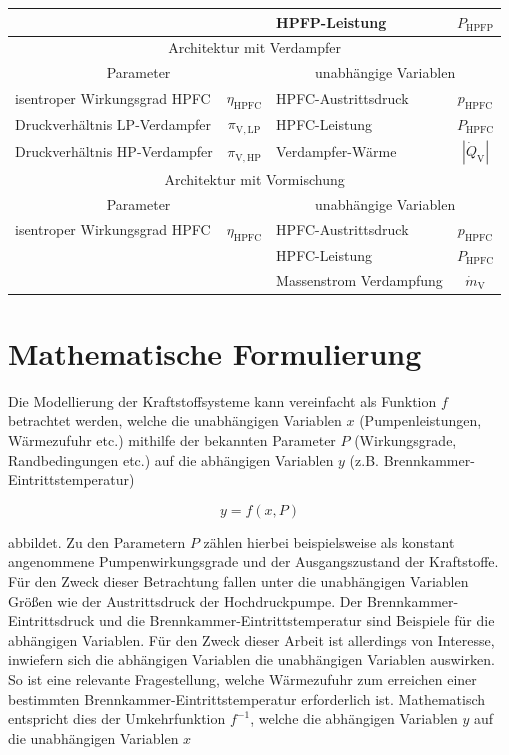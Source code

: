 \begin{table}[ht]
\begin{tabular} {|l|c|l|c|}
    & & HPFP-Leistung & $P_{\mathrm{HPFP}}$ \\ \hline\hline
    \multicolumn{4}{|c|}{Architektur mit Verdampfer}\\ \hline
    \multicolumn{2}{|c}{Parameter} & \multicolumn{2}{|c|}{unabhängige Variablen}\\ \hline\hline%
    isentroper Wirkungsgrad HPFC & $\eta_{\mathrm{HPFC}}$ & HPFC-Austrittsdruck & $p_{\mathrm{HPFC}}$ \\ \hline
    Druckverhältnis LP-Verdampfer & $\pi_{\mathrm{V,LP}}$ & HPFC-Leistung & $P_{\mathrm{HPFC}}$ \\ \hline
    Druckverhältnis HP-Verdampfer & $\pi_\mathrm{V,HP}$ & Verdampfer-Wärme & $|\dot{Q}_\mathrm{V}|$ \\ \hline\hline
    \multicolumn{4}{|c|}{Architektur mit Vormischung}\\ \hline
    \multicolumn{2}{|c}{Parameter} & \multicolumn{2}{|c|}{unabhängige Variablen}\\ \hline\hline%
    isentroper Wirkungsgrad HPFC & $\eta_{\mathrm{HPFC}}$ & HPFC-Austrittsdruck & $p_{\mathrm{HPFC}}$ \\ \hline
    \multicolumn{2}{|c|}{}& HPFC-Leistung & $P_{\mathrm{HPFC}}$ \\ \hline
    \multicolumn{2}{|c|}{}& Massenstrom Verdampfung & $\dot{m}_\mathrm{V}$ \\ \hline
    \end{tabular}	
    \label{Tab:h2_params}%
\end{table}
\FloatBarrier 







\section{Mathematische Formulierung}

Die Modellierung der Kraftstoffsysteme kann vereinfacht als Funktion $f$ betrachtet werden, welche die unabhängigen Variablen $x$ (Pumpenleistungen, Wärmezufuhr etc.) mithilfe der bekannten Parameter $P$ (Wirkungsgrade, Randbedingungen etc.) auf die abhängigen Variablen $y$ (z.B. Brennkammer-Eintrittstemperatur)

\begin{equation}\label{Eq:fuel_func}
	y = f(x, P)
\end{equation}

abbildet. Zu den Parametern $P$ zählen hierbei beispielsweise als konstant angenommene Pumpenwirkungsgrade und der Ausgangszustand der Kraftstoffe. Für den Zweck dieser Betrachtung fallen unter die unabhängigen Variablen Größen wie der Austrittsdruck der Hochdruckpumpe. Der Brennkammer-Eintrittsdruck und die Brennkammer-Eintrittstemperatur sind Beispiele für die abhängigen Variablen. Für den Zweck dieser Arbeit ist allerdings von Interesse, inwiefern sich die abhängigen Variablen die unabhängigen Variablen auswirken. So ist eine relevante Fragestellung, welche Wärmezufuhr zum erreichen einer bestimmten Brennkammer-Eintrittstemperatur erforderlich ist. Mathematisch entspricht dies der Umkehrfunktion $f^{-1}$, welche die abhängigen Variablen $y$ auf die unabhängigen Variablen $x$


